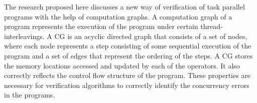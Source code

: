  The research proposed here discusses a new way of verification of task parallel programs with the help of computation graphs. A computation graph of a program represents the execution of the program under certain thread-interleavings. A CG is an acyclic directed graph that consists of a set of nodes, where each node represents a step consisting of some sequential execution of the program and a set of edges that represent the ordering of the steps. A CG stores the memory locations accessed and updated by each of the operators. It also correctly reflects the control flow structure of the program. These properties are necessary for verification algorithms to correctly identify the concurrency errors in the programs.
